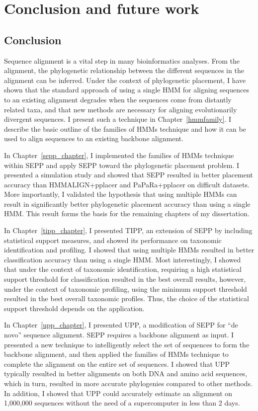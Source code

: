 \chapter{Conclusion and future work}\label{conclusion}
%

\section{Conclusion}
Sequence alignment is a vital step in many bioinformatics analyses.  From the alignment, the phylogenetic relationship between the different sequences in the alignment can be inferred.  Under the context of phylogenetic placement, I have shown that the standard approach of using a single HMM for aligning sequences to an existing alignment degrades when the sequences come from distantly related taxa, and that new methods are necessary for aligning evolutionarily divergent sequences.  I present such a technique in Chapter~\ref{hmmfamily}.  I describe the basic outline of the families of HMMs technique and how it can be used to align sequences to an existing backbone alignment.  

In Chapter~\ref{sepp_chapter}, I implemented the families of HMMs technique within SEPP and apply SEPP toward the phylogenetic placement problem.  I presented a simulation study and showed that SEPP resulted in better placement accuracy than HMMALIGN+pplacer and PaPaRa+pplacer on difficult datasets.  More importantly, I validated the hypothesis that using multiple HMMs can result in significantly better phylogenetic placement accuracy than using a single HMM.  This result forms the basis for the remaining chapters of my dissertation.

In Chapter~\ref{tipp_chapter}, I presented TIPP, an extension of SEPP by including statistical support measures, and showed its performance on  taxonomic identification and profiling.  I showed that using multiple HMMs resulted in better classification accuracy than using a single HMM.  Most interestingly, I showed that under the context of taxonomic identification, requiring a high statistical support threshold for classification resulted in the best overall results, however, under the context of taxonomic profiling, using the minimum support threshold resulted in the best overall taxonomic profiles.  Thus, the choice of the statistical support threshold depends on the application.

In Chapter~\ref{upp_chapter}, I presented UPP, a modification of SEPP for ``de novo'' sequence alignment.  SEPP requires a backbone alignment as input.  I presented a new technique to intelligently select the set of sequences to form the backbone alignment, and then applied the families of HMMs technique to complete the alignment on the entire set of sequences.  I showed that UPP typically resulted in better alignments on both DNA and amino acid sequences, which in turn, resulted in more accurate phylogenies compared to other methods.  In addition, I showed that UPP could accurately estimate an alignment on 1,000,000 sequences without the need of a supercomputer in less than 2 days.


